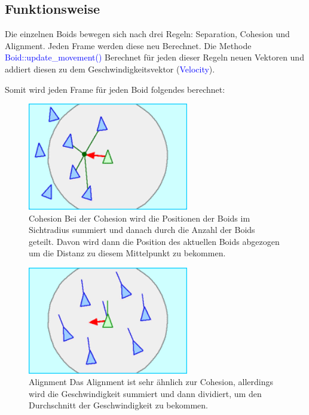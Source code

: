 \documentclass{article}
\begin{document}
        \subsection{Funktionsweise}
            Die einzelnen Boids bewegen sich nach drei Regeln: Separation, Cohesion und Alignment. Jeden Frame werden diese neu Berechnet. 
            \newline Die Methode \textcolor{blue}{Boid::update\_movement()} Berechnet für jeden dieser Regeln neuen Vektoren  und addiert diesen zu dem Geschwindigkeitsvektor (\textcolor{blue}{Velocity}).
            
            \vspace{0.3cm}
            Somit wird jeden Frame für jeden Boid folgendes berechnet: 
            
            \begin{figure}
                \centering
                \includegraphics[width=7cm]{images/cohesion.png}
                \caption{Cohesion  Bei der Cohesion wird die Positionen der Boids im Sichtradius summiert und danach durch die Anzahl der Boids geteilt. Davon wird dann die Position des aktuellen Boids abgezogen um die Distanz zu diesem Mittelpunkt zu bekommen.}
            \end{figure}
            
            \begin{figure}
                \centering
                \includegraphics[width=7cm]{images/alignment.png}
                \caption{Alignment Das Alignment ist sehr ähnlich zur Cohesion, allerdings wird die Geschwindigkeit summiert und dann dividiert, um den Durchschnitt der Geschwindigkeit zu bekommen.}
            \end{figure}
            
\end{document}

